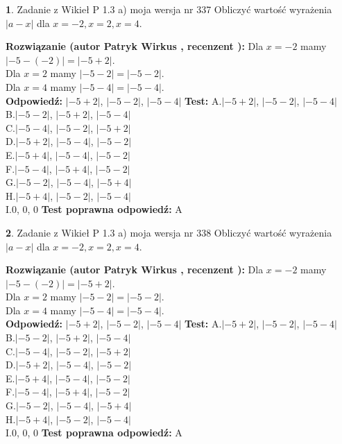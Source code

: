 \documentclass[12pt, a4paper]{article}
\theoremstyle{definition} %
\newtheorem{zad}{}
\newcommand{\zadStart}[1]{\begin{zad}#1\newline}
\newcommand{\zadStop}{\end{zad}}
\newcommand{\rozwStart}[2]{\noindent \textbf{Rozwiązanie (autor #1 , recenzent #2): }\newline}
\newcommand{\rozwStop}{\newline}
\newcommand{\odpStart}{\noindent \textbf{Odpowiedź:}\newline}
\newcommand{\odpStop}{\newline}
\newcommand{\testStart}{\noindent \textbf{Test:}\newline}
\newcommand{\testStop}{\newline}
\newcommand{\kluczStart}{\noindent \textbf{Test poprawna odpowiedź:}\newline}
\newcommand{\kluczStop}{\newline}
\begin{document}
\zadStart{Zadanie z Wikieł P 1.3 a) moja wersja nr 337}
Obliczyć wartość wyrażenia $|a - x|$ dla $x=-2,x=2,x=4$.
\zadStop
\rozwStart{Patryk Wirkus}{}
Dla $x = -2$ mamy $|-5 - (-2)| = |-5 + 2|$.\\
Dla $x = 2$ mamy $|-5 - 2| = |-5 - 2|$.\\
Dla $x = 4$ mamy $|-5 - 4| = |-5 - 4|$.\\
\rozwStop
\odpStart
$|-5 + 2|$, $|-5 - 2|$, $|-5 - 4|$
\odpStop
\testStart
A.$|-5 + 2|$, $|-5 - 2|$, $|-5 - 4|$\\
B.$|-5 - 2|$, $|-5 + 2|$, $|-5 - 4|$\\
C.$|-5 - 4|$, $|-5 - 2|$, $|-5 + 2|$\\
D.$|-5 + 2|$, $|-5 - 4|$, $|-5 - 2|$\\
E.$|-5 + 4|$, $|-5 - 4|$, $|-5 - 2|$\\
F.$|-5 - 4|$, $|-5 + 4|$, $|-5 - 2|$\\
G.$|-5 - 2|$, $|-5 - 4|$, $|-5 + 4|$\\
H.$|-5 + 4|$, $|-5 - 2|$, $|-5 - 4|$\\
I.$0$, $0$, $0$
\testStop
\kluczStart
A
\kluczStop



\zadStart{Zadanie z Wikieł P 1.3 a) moja wersja nr 338}
Obliczyć wartość wyrażenia $|a - x|$ dla $x=-2,x=2,x=4$.
\zadStop
\rozwStart{Patryk Wirkus}{}
Dla $x = -2$ mamy $|-5 - (-2)| = |-5 + 2|$.\\
Dla $x = 2$ mamy $|-5 - 2| = |-5 - 2|$.\\
Dla $x = 4$ mamy $|-5 - 4| = |-5 - 4|$.\\
\rozwStop
\odpStart
$|-5 + 2|$, $|-5 - 2|$, $|-5 - 4|$
\odpStop
\testStart
A.$|-5 + 2|$, $|-5 - 2|$, $|-5 - 4|$\\
B.$|-5 - 2|$, $|-5 + 2|$, $|-5 - 4|$\\
C.$|-5 - 4|$, $|-5 - 2|$, $|-5 + 2|$\\
D.$|-5 + 2|$, $|-5 - 4|$, $|-5 - 2|$\\
E.$|-5 + 4|$, $|-5 - 4|$, $|-5 - 2|$\\
F.$|-5 - 4|$, $|-5 + 4|$, $|-5 - 2|$\\
G.$|-5 - 2|$, $|-5 - 4|$, $|-5 + 4|$\\
H.$|-5 + 4|$, $|-5 - 2|$, $|-5 - 4|$\\
I.$0$, $0$, $0$
\testStop
\kluczStart
A
\kluczStop
\end{document}
